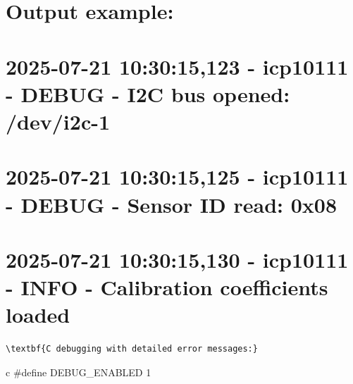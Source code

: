 \documentclass[11pt,a4paper]{article}
\begin{document}
\setcounter{section}{0}
\section{Output example:}


\setcounter{section}{0}
\section{2025-07-21 10:30:15,123 - icp10111 - DEBUG - I2C bus opened: /dev/i2c-1}


\setcounter{section}{0}
\section{2025-07-21 10:30:15,125 - icp10111 - DEBUG - Sensor ID read: 0x08}


\setcounter{section}{0}
\section{2025-07-21 10:30:15,130 - icp10111 - INFO - Calibration coefficients loaded}

\begin{lstlisting}[language=text]
\textbf{C debugging with detailed error messages:}
\end{lstlisting}c
#define DEBUG_ENABLED 1
\end{document}
